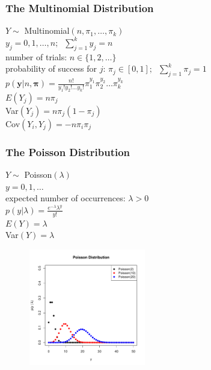 \documentclass[handout]{beamer}
\begin{document}
\begin{frame}
\frametitle{The Multinomial Distribution}
\pause
$Y \sim$ Multinomial$(n,\pi_1, \dots, \pi_k)$\\
\bigskip
\pause
$y_j = 0,1,\dots,n; \; \; \sum_{j=1}^k y_j = n$\\
\bigskip
\pause
number of trials: $n \in \{1,2,\dots \}$\\
\pause
probability of success for $j$: $\pi_j \in [0,1]; \; \; \sum_{j=1}^k
\pi_j = 1$\\
\bigskip
\pause
$p(\mathbf{y}|n,\bm{\pi}) = \frac{n!}{y_1! y_2! \dots
y_k!}\pi_1^{y_1}\pi_2^{y_2} \dots \pi_k ^ {y_k}$\\
\bigskip
\bigskip
\pause
$E(Y_j) = n\pi_j$\\
\bigskip
\pause
Var$(Y_j) = n \pi_j (1 - \pi_j)$\\
\bigskip
\pause
Cov$(Y_i, Y_j) = -n \pi_i \pi_j$


\end{frame}



\begin{frame}
\frametitle{The Poisson Distribution}
\begin{multicols}{2}
\pause
$Y \sim$ Poisson$(\lambda)$\\
\bigskip
\pause
$y = 0,1,\dots$\\
\bigskip
\pause
expected number of occurrences: $\lambda > 0$\\
\bigskip
\pause
$p(y|\lambda) = \frac{e^{-\lambda} \lambda^y}{y!}$\\
\bigskip
\bigskip
\pause
$E(Y) = \lambda$\\
\bigskip
\pause
Var$(Y) = \lambda$
\pause


\begin{figure}[!htp]
\begin{center}
\includegraphics[width=2in, height=2in]{probability-poisson.pdf}
\end{center}
\end{figure}
\end{multicols}
\end{frame}
\end{document}
